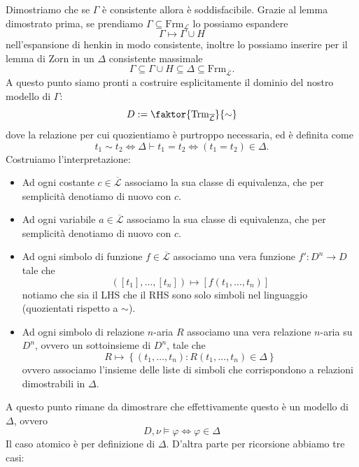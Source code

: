 \documentclass[11pt]{scrartcl}
\begin{document}
 	Dimostriamo che se $\Gamma$ è consistente allora è soddisfacibile. Grazie al lemma dimostrato prima, se prendiamo $\Gamma\subseteq\text{Frm}_\mathcal{L}$ lo possiamo espandere 
 	$$\Gamma\mapsto \Gamma \cup H$$
 	nell'espansione di henkin in modo consistente, inoltre lo possiamo inserire per il lemma di Zorn in un $\Delta$ consistente massimale
 	$$\Gamma\subseteq \Gamma \cup H\subseteq \Delta \subseteq \text{Frm}_{\overline{\mathcal{L}}}.$$
 	A questo punto siamo pronti a costruire esplicitamente il dominio del nostro modello di $\Gamma$:
 	$$D:=\faktor{\text{Trm}_{\overline{\mathcal{L}}}}{\sim}$$
 	dove la relazione per cui quozientiamo è purtroppo necessaria, ed è definita come
 	$$t_1\sim t_2 \iff \Delta \vdash t_1=t_2 \iff (t_1=t_2)\in \Delta.$$
 	Costruiamo l'interpretazione:
 	\begin{itemize}
 		\item Ad ogni costante $c\in \overline{\mathcal{L}}$ associamo la sua classe di equivalenza, che per semplicità denotiamo di nuovo con $c$.
 		\item Ad ogni variabile $a\in \overline{\mathcal{L}}$ associamo la sua classe di equivalenza, che per semplicità denotiamo di nuovo con $c$.  
 		\item Ad ogni simbolo di funzione $f\in \overline{\mathcal{L}}$ associamo una vera funzione $f':D^n\to D$ tale che
 		$$([t_1],\dots,[t_n])\mapsto \left[f(t_1,\dots,t_n)\right]$$ 
 		notiamo che sia il LHS che il RHS sono solo simboli nel linguaggio (quozientati rispetto a $\sim$).
 		\item Ad ogni simbolo di relazione $n$-aria $R$ associamo una vera relazione $n$-aria su $D^n$, ovvero un sottoinsieme di $D^n$, tale che
 		$$R\mapsto \left\{(t_1,\dots,t_n):R(t_1,\dots,t_n)\in \Delta\right\}$$
 		ovvero associamo l'insieme delle liste di simboli che corrispondono a relazioni dimostrabili in $\Delta$.
 	\end{itemize}
 	A questo punto rimane da dimostrare che effettivamente questo è un modello di $\Delta$, ovvero 
 	$$D,\nu \models \varphi \iff \varphi\in \Delta$$
 	Il caso atomico è per definizione di $\Delta$. D'altra parte per ricorsione abbiamo tre casi:
\end{document}
